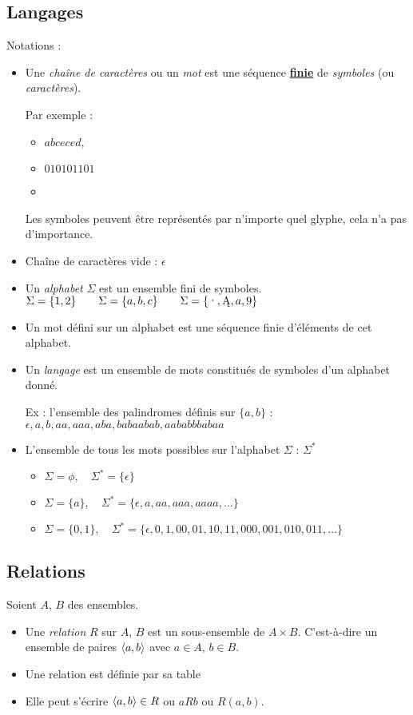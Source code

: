 \subsection{Langages}
\label{subsec:Langages}
Notations :
\begin{itemize}
    \item Une \emph{chaîne de caractères} ou un \emph{mot} est une séquence \textbf{\underline{finie}} de \emph{symboles} (ou \emph{caractères}).

    Par exemple :
    	\begin{itemize}
    		\item $abceced$,
    		\item $010101101$
    		\item {}
    	\end{itemize}
    	Les symboles peuvent être représentés par n'importe quel glyphe, cela n'a pas d'importance.
	\item Chaîne de caractères vide : $\epsilon$
    \item Un \emph{alphabet} $\Sigma$ est un ensemble fini de symboles.
    	\subitem $\Sigma = \{1, 2\}\qquad\Sigma = \{a, b, c\}\qquad\Sigma = \{\ding{189},\ding{129},a,9\}$
    \item Un mot défini sur un alphabet est une séquence finie d'éléments de cet alphabet.
    \item Un \emph{langage} est un ensemble de mots constitués de symboles d'un alphabet donné.

    	\subitem Ex : l'ensemble des palindromes définis sur $\{a, b\}$ : $\epsilon, a, b, aa, aaa, aba, babaabab, aababbbabaa$
	\item L'ensemble de tous les mots possibles sur l'alphabet $\Sigma$ :\; $\Sigma^*$
		\begin{itemize}
			\item $\Sigma = \phi,\quad \Sigma^* = \{\epsilon\}$
			\item $\Sigma = \{a\},\quad \Sigma^* = \{\epsilon, a,aa,aaa,aaaa, \ldots\}$
			\item $\Sigma = \{0,1\},\quad \Sigma^* = \{\epsilon, 0,1,00,01,10,11,000,001,010,011, \ldots\}$
		\end{itemize}
\end{itemize}


\subsection{Relations}
\label{subsec:relations}
Soient $A$, $B$ des ensembles.
\begin{itemize}
	\item Une \emph{relation} $R$ sur $A$, $B$ est un sous-ensemble de $A \times B$. C'est-à-dire
		un ensemble de paires $\langle a,b \rangle$ avec $a\in A$, $b\in B$.
	\item Une relation est définie par sa table
	\item Elle peut s'écrire $\langle a,b \rangle \in R$ ou $aR b$ ou $R(a,b)$.
\end{itemize}

